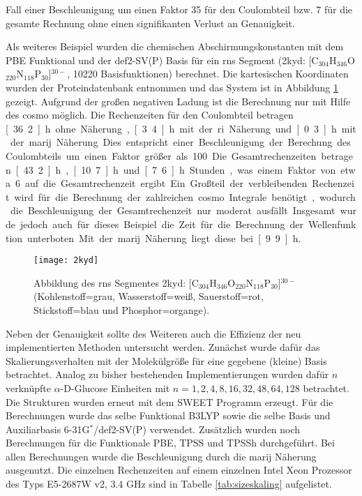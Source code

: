 Fall einer Beschleunigung um einen Faktor 35 für den Coulombteil bzw. 7 für die gesamte Rechnung ohne einen signifikanten Verlust an Genauigkeit. 

Als weiteres Beispiel wurden die chemischen Abschirmungskonstanten mit dem PBE Funktional und der def2-SV(P) Basis für ein \ac{rns} Segment (2kyd\supercite{2kydstructure}: [C$_{304}$H$_{346}$O$_{220}$N$_{118}$P$_{30}$]$^{30-}$, 10220 Basisfunktionen) berechnet. Die kartesischen Koordinaten wurden der Proteindatenbank entnommen und das System ist in Abbildung \ref{abb:2kyd} gezeigt. Aufgrund der großen negativen Ladung ist die Berechnung nur mit Hilfe des \ac{cosmo} möglich. Die Rechenzeiten für den Coulombteil betragen \unit[36.2]{h} ohne Näherung, \unit[3.4]{h} mit der \ac{ri} Näherung und \unit[0.3]{h} mit der \ac{marij} Näherung. Dies entspricht einer Beschleunigung der Berechung des Coulombteils um einen Faktor größer als 100. Die Gesamtrechenzeiten betragen \unit[43.2]{h}, \unit[10.7]{h} und \unit[7.6]{h} Stunden, was einem Faktor von etwa 6 auf die Gesamtrechenzeit ergibt. Ein Großteil der verbleibenden Rechenzeit wird für die Berechnung der zahlreichen \ac{cosmo} Integrale benötigt, wodurch die Beschleunigung der Gesamtrechenzeit nur moderat ausfällt. Insgesamt wurde jedoch auch für dieses Beispiel die Zeit für die Berechnung der Wellenfunktion unterboten. Mit der \ac{marij} Näherung liegt diese bei \unit[9.9]{h}.

\begin{figure}[ht!]
	\centering
	\texttt{[image: 2kyd]}
	\captionsetup{figurewithin = chapter}
	\captionsetup{font=small, labelfont=bf}\caption[{Abbildung eines \ac{rns} Segmentes}]{Abbildung des \ac{rns} Segmentes 2kyd\supercite{2kydstructure}: [C$_{304}$H$_{346}$O$_{220}$N$_{118}$P$_{30}$]$^{30-}$ (Kohlenstoff=grau, Wasserstoff=weiß, Sauerstoff=rot, Stickstoff=blau und Phosphor=organge).}
\label{abb:2kyd}
\end{figure}

\bigskip
Neben der Genauigkeit sollte des Weiteren auch die Effizienz der neu implementierten Methoden untersucht werden. Zunächst wurde dafür das Skalierungsverhalten mit der Molekülgröße für eine gegebene (kleine) Basis betrachtet. Analog zu bisher bestehenden Implementierungen\supercite{beer2011nuclei,kumar2016nuclei} wurden dafür $n$ verknüpfte $\alpha$-D-Glucose Einheiten mit $n=1,2,4,8,16,32,48,64,128$ betrachtet. Die Strukturen wurden erneut mit dem SWEET Programm erzeugt. Für die Berechnungen wurde das selbe Funktional B3LYP\supercite{becke1993density,lee1988development,stephens1994ab} sowie die selbe Basis und Auxiliarbasis 6-31G$^*$/def2-SV(P) verwendet. Zusätzlich wurden noch Berechnungen für die Funktionale PBE, TPSS und TPSSh durchgeführt. Bei allen Berechnungen wurde die Beschleunigung durch die \ac{marij} Näherung ausgenutzt. Die einzelnen Rechenzeiten auf einem einzelnen Intel\textsuperscript{\textregistered} Xeon\textsuperscript{\textregistered} Prozessor des Typs E5-2687W v2, 3.4 GHz sind in Tabelle \ref{tab:sizeskaling} aufgelistet. 

